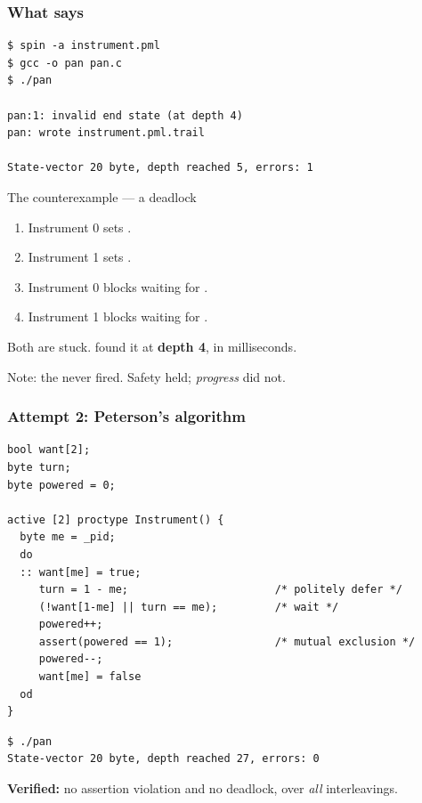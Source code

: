 \begin{frame}[fragile]
  \frametitle{What \spin{} says} \small

\begin{lstlisting}[style=shell]
$ spin -a instrument.pml
$ gcc -o pan pan.c
$ ./pan

pan:1: invalid end state (at depth 4)
pan: wrote instrument.pml.trail

State-vector 20 byte, depth reached 5, errors: 1
\end{lstlisting}

\pause
\vspace{0.3cm}

\begin{block}{The counterexample --- a deadlock}\small
\begin{enumerate}
\item Instrument 0 sets .
\item Instrument 1 sets .
\item Instrument 0 blocks waiting for .
\item Instrument 1 blocks waiting for .
\end{enumerate}
Both are stuck. \spin{} found it at {\bf depth 4}, in milliseconds.
\end{block}

\pause

Note: the  never fired. Safety held; {\em progress} did not.

\end{frame}

\begin{frame}[fragile]
  \frametitle{Attempt 2: Peterson's algorithm} \small

\begin{lstlisting}[language=promela]
bool want[2];
byte turn;
byte powered = 0;

active [2] proctype Instrument() {
  byte me = _pid;
  do
  :: want[me] = true;
     turn = 1 - me;                       /* politely defer */
     (!want[1-me] || turn == me);         /* wait */
     powered++;
     assert(powered == 1);                /* mutual exclusion */
     powered--;
     want[me] = false
  od
}
\end{lstlisting}

\pause
\vspace{0.2cm}

\begin{lstlisting}[style=shell]
$ ./pan
State-vector 20 byte, depth reached 27, errors: 0
\end{lstlisting}

{\bf Verified:} no assertion violation and no deadlock, over {\em all} interleavings.

\end{frame}
